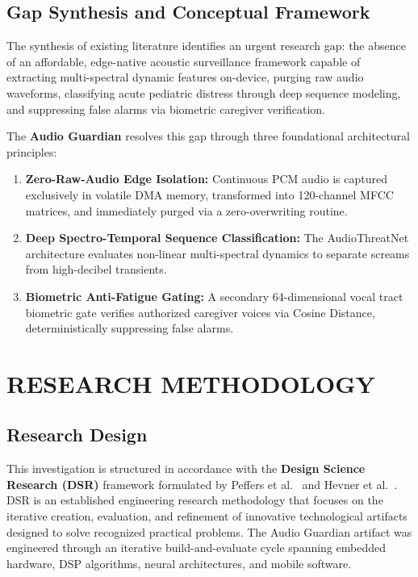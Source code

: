 \documentclass[12pt, a4paper]{report}
\begin{document}
\section{Gap Synthesis and Conceptual Framework}
The synthesis of existing literature identifies an urgent research gap: the absence of an affordable, edge-native acoustic surveillance framework capable of extracting multi-spectral dynamic features on-device, purging raw audio waveforms, classifying acute pediatric distress through deep sequence modeling, and suppressing false alarms via biometric caregiver verification.

The \textbf{Audio Guardian} resolves this gap through three foundational architectural principles:
\begin{enumerate}
    \item \textbf{Zero-Raw-Audio Edge Isolation:} Continuous PCM audio is captured exclusively in volatile DMA memory, transformed into 120-channel MFCC matrices, and immediately purged via a zero-overwriting routine.
    \item \textbf{Deep Spectro-Temporal Sequence Classification:} The AudioThreatNet architecture evaluates non-linear multi-spectral dynamics to separate screams from high-decibel transients.
    \item \textbf{Biometric Anti-Fatigue Gating:} A secondary 64-dimensional vocal tract biometric gate verifies authorized caregiver voices via Cosine Distance, deterministically suppressing false alarms.
\end{enumerate}

\chapter{RESEARCH METHODOLOGY}

\section{Research Design}
This investigation is structured in accordance with the \textbf{Design Science Research (DSR)} framework formulated by Peffers et al.~\cite{ref_peffers2007} and Hevner et al.~\cite{ref_hevner2004}. DSR is an established engineering research methodology that focuses on the iterative creation, evaluation, and refinement of innovative technological artifacts designed to solve recognized practical problems. The Audio Guardian artifact was engineered through an iterative build-and-evaluate cycle spanning embedded hardware, DSP algorithms, neural architectures, and mobile software.
\end{document}
